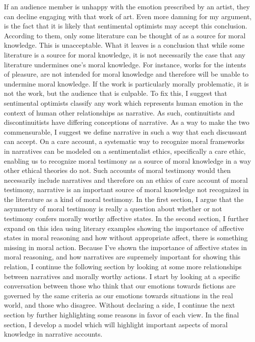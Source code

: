\documentclass[phdthesis,12pt,final]{wuthesis}
\theoremstyle{definition}
\theoremstyle{definition}
\theoremstyle{definition}
\theoremstyle{definition}
\theoremstyle{remark}
\begin{document}
If an audience member is unhappy with the emotion prescribed by an artist, they can decline engaging with that work of art. Even more damning for my argument, is the fact that it is likely that sentimental optimists may accept this conclusion. According to them, only some literature can be thought of as a source for moral knowledge. This is unacceptable. What it leaves is a conclusion that while some literature is a source for moral knowledge, it is not necessarily the case that any literature undermines one's moral knowledge. For instance, works for the intents of pleasure, are not intended for moral knowledge and therefore will be unable to undermine moral knowledge. If the work is particularly morally problematic, it is not the work, but the audience that is culpable. To fix this, I suggest that sentimental optimists classify any work which represents human emotion in the context of human other relationships as narrative. As such, continuitists and discontinuitists have differing conceptions of narrative. As a way to make the two commensurable, I suggest we define narrative in such a way that each discussant can accept. On a care account, a systematic way to recognize moral frameworks in narratives can be modeled on a sentimentalist ethics, specifically a care ethic, enabling us to recognize moral testimony as a source of moral knowledge in a way other ethical theories do not. Such accounts of moral testimony would then necessarily include narratives and therefore on an ethics of care account of moral testimony, narrative is an important source of moral knowledge not recognized in the literature as a kind of moral testimony. In the first section, I argue that the asymmetry of moral testimony is really a question about whether or not testimony confers morally worthy affective states. In the second section, I further expand on this idea using literary examples showing the importance of affective states in moral reasoning and how without appropriate affect, there is something missing in moral action. Because I've shown the importance of affective states in moral reasoning, and how narratives are supremely important for showing this relation, I continue the following section by looking at some more relationships between narratives and morally worthy actions. I start by looking at a specific conversation between those who think that our emotions towards fictions are governed by the same criteria as our emotions towards situations in the real world, and those who disagree. Without declaring a side, I continue the next section by further highlighting some reasons in favor of each view. In the final section, I develop a model which will highlight important aspects of moral knowledge in narrative accounts.
\end{document}
